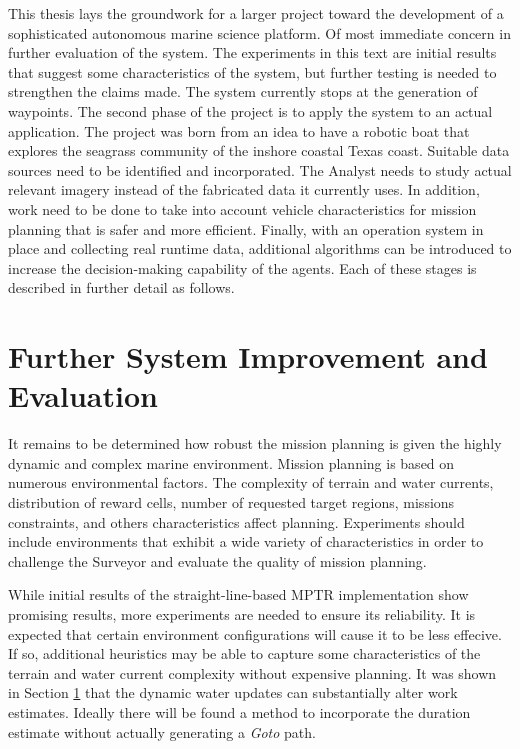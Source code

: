 \documentclass{tamuccthesis}
\begin{document}
This thesis lays the groundwork for a larger project toward the development of a sophisticated autonomous marine science platform. Of most immediate concern in further evaluation of the system. The experiments in this text are initial results that suggest some characteristics of the system, but further testing is needed to strengthen the claims made. The system currently stops at the generation of waypoints. The second phase of the project is to apply the system to an actual application. The project was born from an idea to have a robotic boat that explores the seagrass community of the inshore coastal Texas coast. Suitable data sources need to be identified and incorporated. The Analyst needs to study actual relevant imagery instead of the fabricated data it currently uses. In addition, work need to be done to take into account vehicle characteristics for mission planning that is safer and more efficient. Finally, with an operation system in place and collecting real runtime data, additional algorithms can be introduced to increase the decision-making capability of the agents. Each of these stages is described in further detail as follows.

\section{Further System Improvement and Evaluation}

It remains to be determined how robust the mission planning is given the highly dynamic and complex marine environment. Mission planning is based on numerous environmental factors. The complexity of terrain and water currents, distribution of reward cells, number of requested target regions, missions constraints, and others characteristics affect planning. Experiments should include environments that exhibit a wide variety of characteristics in order to challenge the Surveyor and evaluate the quality of mission planning. 

While initial results of the straight-line-based MPTR implementation show promising results, more experiments are needed to ensure its reliability. It is expected that certain environment configurations will cause it to be less effecive. If so, additional heuristics may be able to capture some characteristics of the terrain and water current complexity without expensive planning. It was shown in Section \ref{} that the dynamic water updates can substantially alter work estimates. Ideally there will be found a method to incorporate the duration estimate without actually generating a \textit{Goto} path. 
\end{document}
